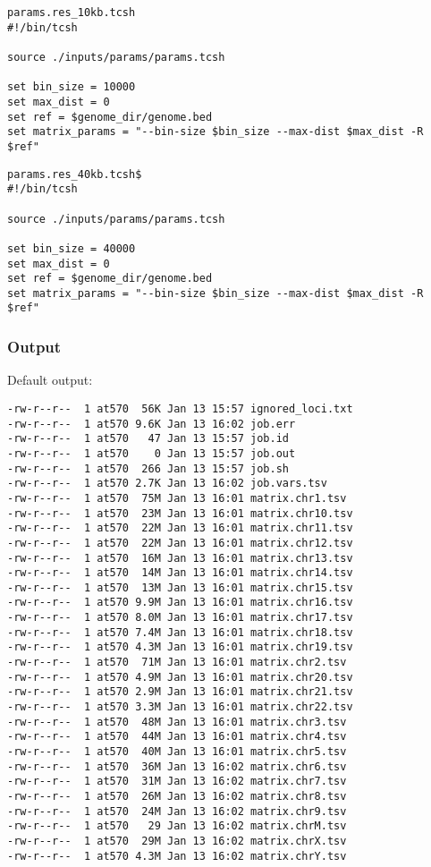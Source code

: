 \begin{lstlisting}
params.res_10kb.tcsh
#!/bin/tcsh

source ./inputs/params/params.tcsh

set bin_size = 10000
set max_dist = 0
set ref = $genome_dir/genome.bed
set matrix_params = "--bin-size $bin_size --max-dist $max_dist -R $ref"
\end{lstlisting}


\begin{lstlisting}
params.res_40kb.tcsh$
#!/bin/tcsh

source ./inputs/params/params.tcsh

set bin_size = 40000
set max_dist = 0
set ref = $genome_dir/genome.bed
set matrix_params = "--bin-size $bin_size --max-dist $max_dist -R $ref"
\end{lstlisting}

\subsubsection{Output} %
Default output: %

\begin{lstlisting}
-rw-r--r--  1 at570  56K Jan 13 15:57 ignored_loci.txt
-rw-r--r--  1 at570 9.6K Jan 13 16:02 job.err
-rw-r--r--  1 at570   47 Jan 13 15:57 job.id
-rw-r--r--  1 at570    0 Jan 13 15:57 job.out
-rw-r--r--  1 at570  266 Jan 13 15:57 job.sh
-rw-r--r--  1 at570 2.7K Jan 13 16:02 job.vars.tsv
-rw-r--r--  1 at570  75M Jan 13 16:01 matrix.chr1.tsv
-rw-r--r--  1 at570  23M Jan 13 16:01 matrix.chr10.tsv
-rw-r--r--  1 at570  22M Jan 13 16:01 matrix.chr11.tsv
-rw-r--r--  1 at570  22M Jan 13 16:01 matrix.chr12.tsv
-rw-r--r--  1 at570  16M Jan 13 16:01 matrix.chr13.tsv
-rw-r--r--  1 at570  14M Jan 13 16:01 matrix.chr14.tsv
-rw-r--r--  1 at570  13M Jan 13 16:01 matrix.chr15.tsv
-rw-r--r--  1 at570 9.9M Jan 13 16:01 matrix.chr16.tsv
-rw-r--r--  1 at570 8.0M Jan 13 16:01 matrix.chr17.tsv
-rw-r--r--  1 at570 7.4M Jan 13 16:01 matrix.chr18.tsv
-rw-r--r--  1 at570 4.3M Jan 13 16:01 matrix.chr19.tsv
-rw-r--r--  1 at570  71M Jan 13 16:01 matrix.chr2.tsv
-rw-r--r--  1 at570 4.9M Jan 13 16:01 matrix.chr20.tsv
-rw-r--r--  1 at570 2.9M Jan 13 16:01 matrix.chr21.tsv
-rw-r--r--  1 at570 3.3M Jan 13 16:01 matrix.chr22.tsv
-rw-r--r--  1 at570  48M Jan 13 16:01 matrix.chr3.tsv
-rw-r--r--  1 at570  44M Jan 13 16:01 matrix.chr4.tsv
-rw-r--r--  1 at570  40M Jan 13 16:01 matrix.chr5.tsv
-rw-r--r--  1 at570  36M Jan 13 16:02 matrix.chr6.tsv
-rw-r--r--  1 at570  31M Jan 13 16:02 matrix.chr7.tsv
-rw-r--r--  1 at570  26M Jan 13 16:02 matrix.chr8.tsv
-rw-r--r--  1 at570  24M Jan 13 16:02 matrix.chr9.tsv
-rw-r--r--  1 at570   29 Jan 13 16:02 matrix.chrM.tsv
-rw-r--r--  1 at570  29M Jan 13 16:02 matrix.chrX.tsv
-rw-r--r--  1 at570 4.3M Jan 13 16:02 matrix.chrY.tsv
\end{lstlisting}
\clearpage